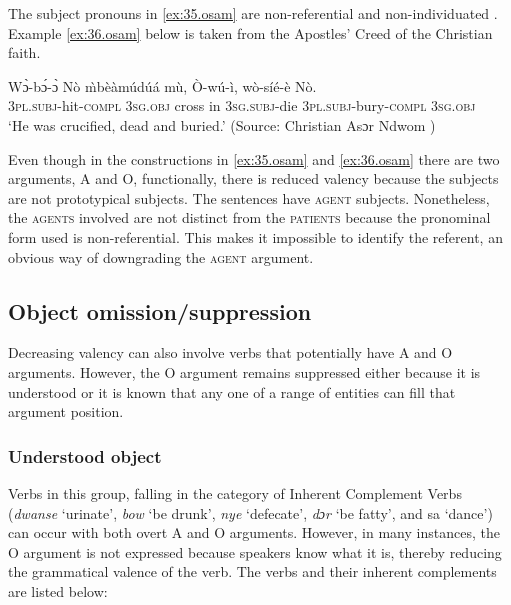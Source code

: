 \documentclass[output=paper]{langsci/langscibook}
\begin{document}
	\z
\z



The subject pronouns in \ref{ex:35.osam} are non-referential and non-individuated \citep{hopperthompson1980}. Example \ref{ex:36.osam} below is taken from the Apostles' Creed of the Christian faith. 

\ea
\label{ex:36.osam}
\gll Wɔ̀-bɔ́-ɔ̀       N\`{o}    \`{m}b\`{e}\`{a}m\'{u}d\'{u}\'{a}  m\`{u}, \`{O}-w\'{u}-\`{i},     w\`{o}-s\'{i}\'{e}-\`{e}     N\`{o}.\\
     \textsc{3pl.subj}-hit\textsc{-compl}  \textsc{3sg.obj}  cross in \textsc{3sg.subj}-die  \textsc{3pl.subj}-bury\textsc{-compl}  \textsc{3sg.obj}\\
\glt `He was crucified, dead and buried.' (Source: Christian Asɔr Ndwom \citep{methodist1937})
\z

Even though in the constructions in \ref{ex:35.osam} and \ref{ex:36.osam} there are two arguments, A and O, functionally, there is reduced valency because the subjects are not prototypical subjects. The sentences have \textsc{agent} subjects. Nonetheless, the \textsc{agents} involved are not distinct from the \textsc{patients} because the pronominal form used is non-referential. This makes it impossible to identify the referent, an obvious way of downgrading the \textsc{agent} argument.

\subsection{Object omission/suppression}\label{§4.5:object.osam}

Decreasing valency can also involve verbs that potentially have A and O arguments. However, the O argument remains suppressed either because it is understood or it is known that any one of a range of entities can fill that argument position.

\subsubsection{Understood object}\label{§4.5.1:understood.osam}

Verbs in this group, falling in the category of Inherent Complement Verbs (\textit{dwanse} `urinate', \textit{bow} `be drunk', \textit{nye} `defecate', \textit{dɔr} `be fatty', and sa `dance') can occur with both overt A and O arguments. However, in many instances, the O argument is not expressed because speakers know what it is, thereby reducing the grammatical valence of the verb. The verbs and their inherent complements are listed below:
\end{document}
